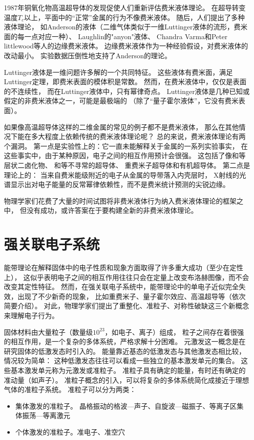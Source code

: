 \documentclass{article}
\begin{document}
1987年铜氧化物高温超导体的发现促使人们重新评估费米液体理论。
在超导转变温度$T_c$以上，平面中的“正常”金属的行为不像费米液体。
随后，人们提出了多种液体理论，
如Anderson的液体（二维气体类似于一维Luttinger液体的流形，费米面的每一点对应一种）、
Laughlin的"anyon"液体、
Chandra Varma和Peter littlewood等人的边缘费米液体。
边缘费米液体作为一种经验假设，对费米液体的改动最小。
实验数据压倒性地支持了Anderson的理论。

Luttinger液体是一维问题许多解的一个共同特征。
这些液体有费米面，满足Luttinger定理，即费米表面的模体积是常数。
然而，在费米液体中，仅仅是表面的不连续性，
而在Luttinger液体中，只有幂律奇点。
Luttinger液体是几种已知或假定的非费米液体之一，可能是最极端的
（除了“量子霍尔液体”，它没有费米表面）。

如果像高温超导体这样的二维金属的常见的例子都不是费米液体，
那么在其他情况下能在多大程度上依赖传统的费米液体理论呢？
总的来说，费米液体理论有两个漏洞。
第一点是实验性上的：它一直未能解释关于金属的一系列实验事实，
在这些事实中，由于某种原因，电子之间的相互作用预计会很强。
这包括了像和等层状二卤化物、
和等不寻常的超导体、
重费米子超导体和有机超导体。
第二点是理论上的：
当来自费米能级附近的电子从金属的导带落入内壳层时，
X射线的光谱显示出对电子能量的反常幂律依赖性，而不是费米统计预测的尖锐边缘。 

物理学家们花费了大量的时间试图将非费米液体行为纳入费米液体理论的框架之中，
但没有成功，或许答案在于要构建全新的非费米液体理论。

\section{强关联电子系统}
能带理论在解释固体中的电子性质和现象方面取得了许多重大成功（至少在定性上），
这似乎表明电子之间的相互作用往往只会在定量上改变布洛赫图像，而不会改变其定性特征。
然而，在强关联电子系统中，能带理论中的单电子近似完全失效，出现了不少新奇的现象，
比如重费米子、量子霍尔效应、高温超导等（依次简要介绍）。
对此，物理学家们提出了重整化、准粒子、对称性破缺这三个新概念来理解电子行为。


固体材料由大量粒子（数量级$10^{23}$，如电子、离子）组成，
粒子之间存在着很强的相互作用，是一个复杂的多体系统，严格求解十分困难。
元激发这一概念是在研究固体的低激发态时引入的。
能量靠近基态的低激发态与其他激发态相比较，情况较为简单：
这种低激发态往往可以看成一些独立的基本激发单元的集合。
这些基本激发单元称为元激发或准粒子。
准粒子具有确定的能量，有时还有确定的准动量（如声子）。
准粒子概念的引入，可以将复杂的多体系统简化成接近于理想气体的准粒子系统。
准粒子可以分为两类：
\begin{itemize}
    \item 集体激发的准粒子。
    晶格振动的格波---声子、自旋波---磁振子、等离子区集体振荡---等离激元
    \item 个体激发的准粒子。准电子、准空穴
\end{itemize}
\end{document}
